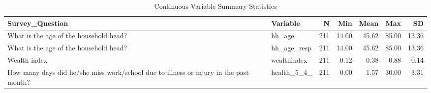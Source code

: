 \begin{table}[!t]
\caption*{
{\large Continuous Variable Summary Statistics}
} 
\fontsize{12.0pt}{14.4pt}\selectfont
\begin{tabular*}{\linewidth}{@{\extracolsep{\fill}}llrrrrr}
\toprule
Survey\_Question & Variable & N & Min & Mean & Max & SD \\ 
\midrule\addlinespace[2.5pt]
What is the age of the household head? & hh\_age\_ & 211 & 14.00 & 45.62 & 85.00 & 13.36 \\ 
What is the age of the household head? & hh\_age\_resp & 211 & 14.00 & 45.62 & 85.00 & 13.36 \\ 
Wealth index & wealthindex & 211 & 0.12 & 0.38 & 0.88 & 0.14 \\ 
How many days did he/she miss work/school due to illness or injury in the past month? & health\_5\_4\_ & 211 & 0.00 & 1.57 & 30.00 & 3.31 \\ 
\bottomrule
\end{tabular*}
\end{table}

